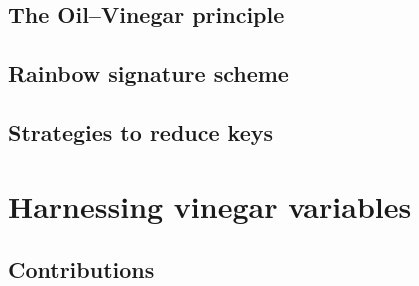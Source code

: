 \documentclass[openright]{report}
\begin{document}
\section{The Oil--Vinegar principle}

\section{Rainbow signature scheme}

\section{Strategies to reduce keys}

\chapter{Harnessing vinegar variables}

\section{Contributions}



\end{document}
